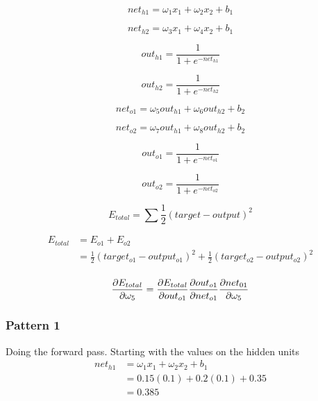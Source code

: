 \documentclass[10pt,a4paper]{article}
\begin{document}
\begin{equation}
net_{h1} = \omega_1 x_1 + \omega_2 x_2 + b_1
\end{equation}

\begin{equation}
net_{h2} = \omega_3 x_1 + \omega_4 x_2 + b_1
\end{equation}

\begin{equation}
out_{h1} = \frac{1}{1+e^{-net_{h1}}}
\end{equation}

\begin{equation}
out_{h2} = \frac{1}{1+e^{-net_{h2}}}
\end{equation}

\begin{equation}
net_{o1} = \omega_5 out_{h1} + \omega_6 out_{h2} + b_2
\end{equation}

\begin{equation}
net_{o2} = \omega_7 out_{h1} + \omega_8 out_{h2} + b_2
\end{equation}

\begin{equation}
out_{o1} = \frac{1}{1+e^{-net_{o1}}}
\end{equation}

\begin{equation}
out_{o2} = \frac{1}{1+e^{-net_{o2}}}
\end{equation}

\begin{equation}
E_{total} = \sum \frac{1}{2}(target-output)^2
\end{equation}

\begin{equation}
\begin{split}
E_{total} &= E_{o1} + E_{o2} \\
          &= \frac{1}{2}(target_{o1}-output_{o1})^2 + \frac{1}{2}(target_{o2}-output_{o2})^2 \\
\end{split}
\end{equation}

\begin{equation}
\pdv{E_{total}}{\omega_5} = \pdv{E_{total}}{out_{o1}} \pdv{out_{o1}}{net_{o1}} \pdv{net_{01}}{\omega_5}
\end{equation}


\subsubsection{Pattern 1}
Doing the forward pass. Starting with the values on the hidden units
\begin{equation}
\begin{split}
net_{h1} &= \omega_1 x_1 + \omega_2 x_2 + b_1 \\
         &= 0.15(0.1) + 0.2(0.1) + 0.35 \\
         &= 0.385\\
\end{split}
\end{equation}
\end{document}
